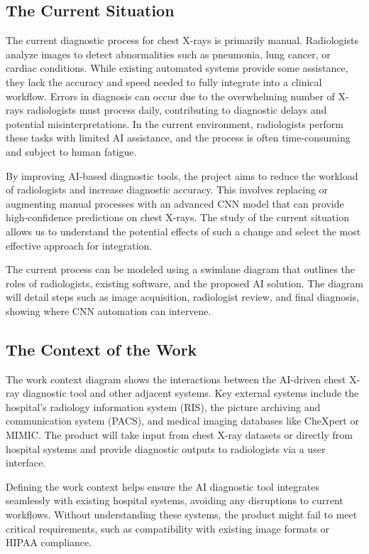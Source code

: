 \documentclass[12pt]{article}
\begin{document}
\subsection{The Current Situation}
The current diagnostic process for chest X-rays is primarily manual. Radiologists analyze images to detect abnormalities such as pneumonia, lung cancer, or cardiac conditions. While existing automated systems provide some assistance, they lack the accuracy and speed needed to fully integrate into a clinical workflow. Errors in diagnosis can occur due to the overwhelming number of X-rays radiologists must process daily, contributing to diagnostic delays and potential misinterpretations. In the current environment, radiologists perform these tasks with limited AI assistance, and the process is often time-consuming and subject to human fatigue.

By improving AI-based diagnostic tools, the project aims to reduce the workload of radiologists and increase diagnostic accuracy. This involves replacing or augmenting manual processes with an advanced CNN model that can provide high-confidence predictions on chest X-rays. The study of the current situation allows us to understand the potential effects of such a change and select the most effective approach for integration.

The current process can be modeled using a swimlane diagram that outlines the roles of radiologists, existing software, and the proposed AI solution. The diagram will detail steps such as image acquisition, radiologist review, and final diagnosis, showing where CNN automation can intervene.

\subsection{The Context of the Work}
The work context diagram shows the interactions between the AI-driven chest X-ray diagnostic tool and other adjacent systems. Key external systems include the hospital's radiology information system (RIS), the picture archiving and communication system (PACS), and medical imaging databases like CheXpert or MIMIC. The product will take input from chest X-ray datasets or directly from hospital systems and provide diagnostic outputs to radiologists via a user interface.

Defining the work context helps ensure the AI diagnostic tool integrates seamlessly with existing hospital systems, avoiding any disruptions to current workflows. Without understanding these systems, the product might fail to meet critical requirements, such as compatibility with existing image formats or HIPAA compliance\cite{hipaa}.
\end{document}
